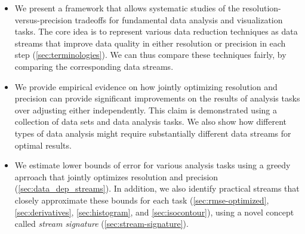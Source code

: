 \begin{itemize}
\item We present a framework that allows systematic studies of the resolution-versus-precision
  tradeoffs for fundamental data analysis and visualization tasks. The core idea is to represent
  various data reduction techniques as data streams that improve data quality in either resolution
  or precision in each step (\autoref{sec:terminologies}). We can thus compare these techniques
  fairly, by comparing the corresponding data streams.
   
\item We provide empirical evidence on how jointly optimizing resolution and precision can provide
  significant improvements on the results of analysis tasks over adjusting either independently.
  This claim is demonstrated using a collection of data sets and data analysis tasks. We also show
  how different types of data analysis might require substantially different data streams for
  optimal results.

\item We estimate lower bounds of error for various analysis tasks using a greedy aprroach that
  jointly optimizes resolution and precision (\autoref{sec:data_dep_streams}). In addition, we also
  identify practical streams that closely approximate these bounds for each task
  (\autoref{sec:rmse-optimized}, \autoref{sec:derivatives}, \autoref{sec:histogram}, and
  \autoref{sec:isocontour}), using a novel concept called \emph{stream signature}
  (\autoref{sec:stream-signature}).
\end{itemize}


